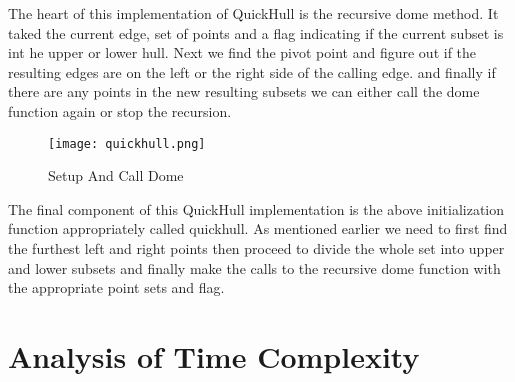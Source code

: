 \documentclass[a4paper, 12pt]{article}
\begin{document}
{The heart of this implementation of QuickHull is the recursive dome method. It taked the current edge, set of points and a flag indicating if the current subset is int he upper or lower hull. Next we find the pivot point and figure out if the resulting edges are on the left or the right side of the calling edge. and finally if there are any points in the new resulting subsets we can either call the dome function again or stop the recursion. 

  \begin{figure}[H]
  \begin{center}
    \texttt{[image: quickhull.png]}
  \end{center}
    \caption{Setup And Call Dome}
    \label{fig:quickhull}
  \end{figure}

  The final component of this QuickHull implementation is the above initialization function appropriately called quickhull.  As mentioned earlier we need to first find the furthest left and right points then proceed to divide the whole set into upper and lower subsets and finally make the calls to the recursive dome function with the appropriate point sets and flag. 

  \section{Analysis of Time Complexity}
}
\end{document}
